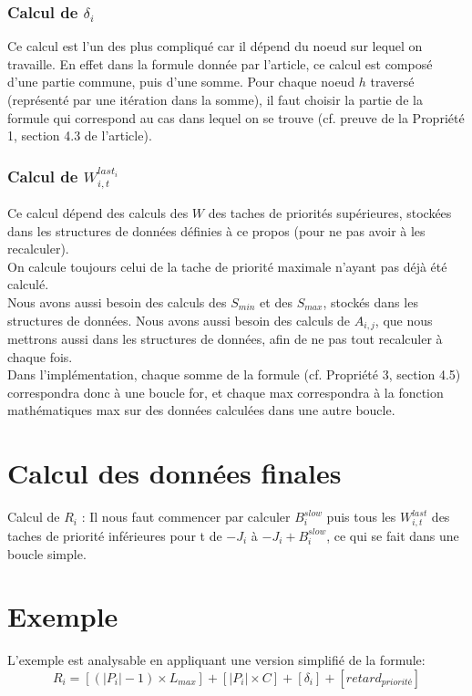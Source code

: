 \documentclass[10pt,a4paper]{article}
\begin{document}
\subsubsection{Calcul de $\delta_i$}
Ce calcul est l'un des plus compliqué car il dépend du noeud sur lequel on 
travaille. En effet dans la formule donnée par l'article, ce calcul est composé 
d'une partie commune, puis d'une somme. Pour chaque noeud $h$ traversé 
(représenté par une itération dans la somme), il faut choisir la partie de la 
formule qui correspond au cas dans lequel on se trouve (cf. preuve de la 
Propriété 1, section 4.3 de l'article).

\subsubsection{Calcul de $W_{i,t}^{last_i}$}
Ce calcul dépend des calculs des 
$W$ des taches de priorités supérieures, stockées dans les structures de 
données définies à ce propos (pour ne pas avoir à les
recalculer). \\
On calcule toujours celui de la tache de priorité maximale n'ayant 
pas déjà été calculé.\\
Nous avons aussi besoin des calculs des ${S_{min}}$ et des 
$S_{max}$, stockés dans les
structures de données. Nous avons aussi besoin des calculs de $A_{i,j}$, que nous mettrons aussi 
dans les structures de données, afin de ne pas tout recalculer à chaque fois.\\
Dans l'implémentation, chaque somme de la formule (cf. Propriété 3, section 
4.5) correspondra donc à une boucle for, et chaque max correspondra à la 
fonction mathématiques max sur des données calculées dans une autre boucle.


\section{Calcul des données finales}
Calcul de $R_i$ : Il nous faut commencer par calculer $B_i^{slow}$ puis tous les $W_{i,t}^{last}$ 
des taches de priorité inférieures pour t de $-J_i$ à $-J_i + B_i^{slow}$, ce qui se fait dans 
une boucle simple.


\section{Exemple}
L'exemple est analysable en appliquant une version simplifié de la formule:
\[R_{i} = [(|P_i| - 1 ) \times L_{max}] + [|P_i| \times C] + [\delta_i]  + [retard_{priorité}]\]
\end{document}
